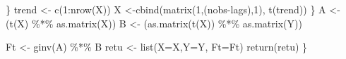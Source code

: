 \documentclass[
]{book}
\newenvironment{Shaded}{\begin{snugshade}}{\end{snugshade}}
\newcommand{\AttributeTok}[1]{\textcolor[rgb]{0.77,0.63,0.00}{#1}}
\newcommand{\DecValTok}[1]{\textcolor[rgb]{0.00,0.00,0.81}{#1}}
\newcommand{\FunctionTok}[1]{\textcolor[rgb]{0.00,0.00,0.00}{#1}}
\newcommand{\NormalTok}[1]{#1}
\newcommand{\OtherTok}[1]{\textcolor[rgb]{0.56,0.35,0.01}{#1}}
\newcommand{\SpecialCharTok}[1]{\textcolor[rgb]{0.00,0.00,0.00}{#1}}
\begin{document}
\begin{Shaded}
\begin{Highlighting}[]
\NormalTok{      \}}
\NormalTok{      trend }\OtherTok{\textless{}{-}} \FunctionTok{c}\NormalTok{(}\DecValTok{1}\SpecialCharTok{:}\FunctionTok{nrow}\NormalTok{(X))}
\NormalTok{      X }\OtherTok{\textless{}{-}}\FunctionTok{cbind}\NormalTok{(}\FunctionTok{matrix}\NormalTok{(}\DecValTok{1}\NormalTok{,(nobs}\SpecialCharTok{{-}}\NormalTok{lags),}\DecValTok{1}\NormalTok{), }\FunctionTok{t}\NormalTok{(trend))}
\NormalTok{    \}}
\NormalTok{A }\OtherTok{\textless{}{-}}\NormalTok{ (}\FunctionTok{t}\NormalTok{(X) }\SpecialCharTok{\%*\%} \FunctionTok{as.matrix}\NormalTok{(X)) }
\NormalTok{B }\OtherTok{\textless{}{-}}\NormalTok{ (}\FunctionTok{as.matrix}\NormalTok{(}\FunctionTok{t}\NormalTok{(X)) }\SpecialCharTok{\%*\%} \FunctionTok{as.matrix}\NormalTok{(Y))}

\NormalTok{Ft }\OtherTok{\textless{}{-}} \FunctionTok{ginv}\NormalTok{(A) }\SpecialCharTok{\%*\%}\NormalTok{ B}
\NormalTok{retu }\OtherTok{\textless{}{-}} \FunctionTok{list}\NormalTok{(}\AttributeTok{X=}\NormalTok{X,}\AttributeTok{Y=}\NormalTok{Y, }\AttributeTok{Ft=}\NormalTok{Ft)}
\FunctionTok{return}\NormalTok{(retu)}
\NormalTok{\}}


\end{Highlighting}
\end{Shaded}
\end{document}
